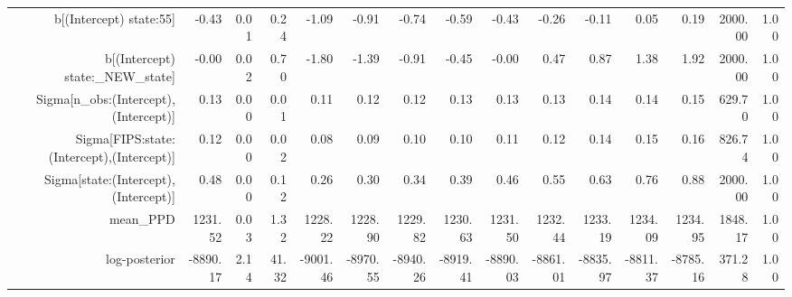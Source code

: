 \begin{table}[ht]
\begin{tabular}{rrrrrrrrrrrrrrr}
  b[(Intercept) state:55] & -0.43 & 0.01 & 0.24 & -1.09 & -0.91 & -0.74 & -0.59 & -0.43 & -0.26 & -0.11 & 0.05 & 0.19 & 2000.00 & 1.00 \\ 
  b[(Intercept) state:\_NEW\_state] & -0.00 & 0.02 & 0.70 & -1.80 & -1.39 & -0.91 & -0.45 & -0.00 & 0.47 & 0.87 & 1.38 & 1.92 & 2000.00 & 1.00 \\ 
  Sigma[n\_obs:(Intercept),(Intercept)] & 0.13 & 0.00 & 0.01 & 0.11 & 0.12 & 0.12 & 0.13 & 0.13 & 0.13 & 0.14 & 0.14 & 0.15 & 629.70 & 1.00 \\ 
  Sigma[FIPS:state:(Intercept),(Intercept)] & 0.12 & 0.00 & 0.02 & 0.08 & 0.09 & 0.10 & 0.10 & 0.11 & 0.12 & 0.14 & 0.15 & 0.16 & 826.74 & 1.00 \\ 
  Sigma[state:(Intercept),(Intercept)] & 0.48 & 0.00 & 0.12 & 0.26 & 0.30 & 0.34 & 0.39 & 0.46 & 0.55 & 0.63 & 0.76 & 0.88 & 2000.00 & 1.00 \\ 
  mean\_PPD & 1231.52 & 0.03 & 1.32 & 1228.22 & 1228.90 & 1229.82 & 1230.63 & 1231.50 & 1232.44 & 1233.19 & 1234.09 & 1234.95 & 1848.17 & 1.00 \\ 
  log-posterior & -8890.17 & 2.14 & 41.32 & -9001.46 & -8970.55 & -8940.26 & -8919.41 & -8890.03 & -8861.01 & -8835.97 & -8811.37 & -8785.16 & 371.28 & 1.00 \\ 
   \hline
\end{tabular}
\end{table}

